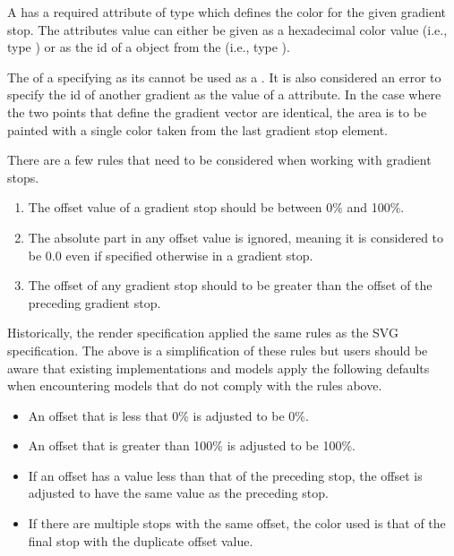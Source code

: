 A \GradientStop has a required attribute  of type
 which defines the color for the given gradient stop. The
attributes value can either be given as a hexadecimal color value (i.e., type ) or as the id
of a \ColorDefinition object from the \ListOfColorDefinitions(i.e., type ).    

The  of a \ColorDefinition specifying  as its  cannot be used as a . It is also considered an error to specify the id of another gradient as the value of a  attribute.
In the case where the two points that define the gradient vector are identical, the area
is to be painted with a single color taken from the last gradient stop element.

There are a few rules that need to be considered when working with gradient stops.

\begin{enumerate}
\item{The offset value of a gradient stop should be between 0\% and 100\%.}
\item{The absolute part in any offset value is ignored, meaning it is considered to be 0.0 even if specified otherwise in a gradient stop.}
\item{The offset of any gradient stop should to be greater than the offset of the preceding gradient stop.}
\end{enumerate}

Historically, the render specification applied the same rules as the SVG specification. The above is a simplification of these rules but users should be aware that existing implementations and models apply the following defaults when encountering models that do not comply with the rules above. 

\begin{itemize}
\item{An offset that is less that 0\% is adjusted to be 0\%.}
\item{An offset that is greater than 100\% is adjusted to be 100\%.}
\item{If an offset has a value less than that of the preceding stop, the offset is adjusted to have the same value as the preceding stop.}
\item{If there are multiple stops with the same offset, the color used is that of the final stop with the duplicate offset value.}
\end{itemize}
